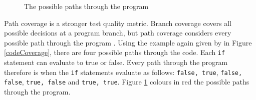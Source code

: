 \begin{figure}
    \caption{The possible paths through the program}%
    \label{programPaths}%
\end{figure}

Path coverage is a stronger test quality metric. Branch coverage covers all possible decisions at a program branch, but path coverage considers every possible path through the program \citep{Myers:2004:AST:983238}\citep{softwareTestingIntro}. Using the example again given by \citet{Myers:2004:AST:983238} in Figure \ref{codeCoverage}, there are four possible paths through the code. Each \verb+if+ statement can evaluate to true or false. Every path through the program therefore is when the \verb+if+ statements evaluate as follows: \verb+false, true+, \verb+false, false+, \verb+true, false+ and \verb+true, true+. Figure \ref{programPaths} colours in red the possible paths through the program.


